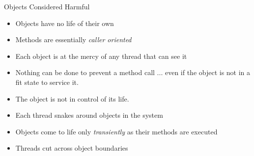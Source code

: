 \documentclass{concdistfoils}
\def\heading#1{\begin{cframed}[8.8in]{#1}\end{cframed}}
\begin{document}
\begin{slide}
\heading{Objects Considered Harmful}
\vfill
\begin{minipage}{5in}
\begin{itemize}
\item Objects have no life of their own

\item Methods are essentially \textit{caller oriented}

\item Each object is at the mercy of any thread that can see it

\item Nothing can be done
to prevent a method
call ...
 even if the object is not in a fit state to service it. 

\item The object is not in control of its life.
\end{itemize}
\end{minipage}
\begin{minipage}{5in}
\begin{center}
\end{center}
\end{minipage}
\end{slide}

\begin{slide}
\begin{minipage}{5in}
\begin{itemize}
\item Each thread snakes around objects in the system

\item Objects come to life only \textit{transiently} as their methods are executed

\item Threads cut across object boundaries
\end{itemize}
\end{minipage}
\begin{minipage}{5in}
\begin{center}
\end{center}
\end{minipage}
\end{slide}
\end{document}
